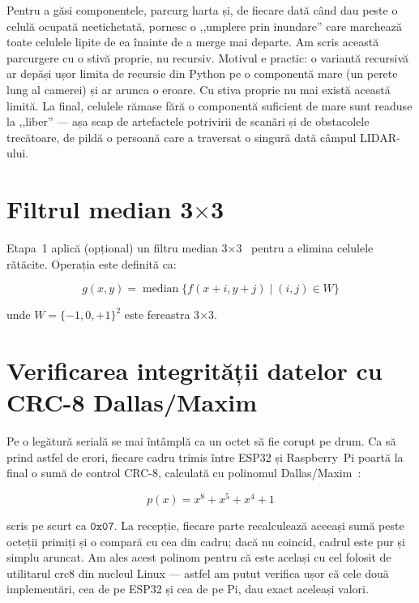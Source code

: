 \documentclass[a4paper,12pt,twoside,openany]{report}
\renewcommand{\texttt}[1]{\textnormal{#1}}
\begin{document}
Pentru a găsi componentele, parcurg harta și, de fiecare dată când dau peste o
celulă ocupată neetichetată, pornesc o ,,umplere prin inundare'' care marchează
toate celulele lipite de ea înainte de a merge mai departe. Am scris această
parcurgere cu o stivă proprie, nu recursiv. Motivul e practic: o variantă
recursivă ar depăși ușor limita de recursie din Python pe o componentă mare
(un perete lung al camerei) și ar arunca o eroare. Cu stiva proprie nu mai
există această limită. La final, celulele rămase fără o componentă suficient de
mare sunt readuse la ,,liber'' — așa scap de artefactele potrivirii de scanări
și de obstacolele trecătoare, de pildă o persoană care a traversat o singură
dată câmpul LIDAR-ului.

\section{Filtrul median 3\texorpdfstring{$\times$}{x}3}
\label{sec:median}

Etapa~1 aplică (opțional) un filtru median 3$\times$3~\cite{tukey1977eda}
pentru a elimina celulele rătăcite. Operația este definită ca:

\begin{equation}\label{eq:median}
    g(x, y) = \operatorname{median}\{f(x+i, y+j) \mid (i, j) \in W\}
\end{equation}

\noindent unde $W = \{-1, 0, +1\}^2$ este fereastra 3$\times$3.

\section{Verificarea integrității datelor cu CRC-8 Dallas/Maxim}
\label{sec:crc}

Pe o legătură serială se mai întâmplă ca un octet să fie corupt pe drum. Ca să
prind astfel de erori, fiecare cadru trimis între ESP32 și Raspberry~Pi poartă
la final o sumă de control CRC-8, calculată cu polinomul
Dallas/Maxim~\cite{maxim1wirecrc, linuxcrc8}:

\begin{equation}\label{eq:crc-poly}
    p(x) = x^8 + x^5 + x^4 + 1
\end{equation}

\noindent scris pe scurt ca $\mathtt{0x07}$. La recepție, fiecare parte
recalculează aceeași sumă peste octeții primiți și o compară cu cea din cadru;
dacă nu coincid, cadrul este pur și simplu aruncat. Am ales acest polinom
pentru că este același cu cel folosit de utilitarul \texttt{crc8} din nucleul
Linux — astfel am putut verifica ușor că cele două implementări, cea de pe
ESP32 și cea de pe Pi, dau exact aceleași valori.
\end{document}
